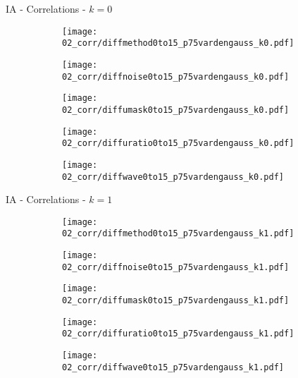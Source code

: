 \documentclass{beamer}
\begin{document}
\begin{frame}{IA - Correlations - $k=0$}{}
\begin{figure}
\centering
\begin{subfigure}{0.19\textwidth}
\texttt{[image: 02\_corr/diffmethod0to15\_p75vardengauss\_k0.pdf]}
\end{subfigure}
\begin{subfigure}{0.19\textwidth}
\texttt{[image: 02\_corr/diffnoise0to15\_p75vardengauss\_k0.pdf]}
\end{subfigure}
\begin{subfigure}{0.19\textwidth}
\texttt{[image: 02\_corr/diffumask0to15\_p75vardengauss\_k0.pdf]}
\end{subfigure}
\begin{subfigure}{0.19\textwidth}
\texttt{[image: 02\_corr/diffuratio0to15\_p75vardengauss\_k0.pdf]}
\end{subfigure}
\begin{subfigure}{0.19\textwidth}
\texttt{[image: 02\_corr/diffwave0to15\_p75vardengauss\_k0.pdf]}
\end{subfigure}
\end{figure}
\end{frame}

\begin{frame}{IA - Correlations - $k=1$}{}
\begin{figure}
\centering
\begin{subfigure}{0.19\textwidth}
\texttt{[image: 02\_corr/diffmethod0to15\_p75vardengauss\_k1.pdf]}
\end{subfigure}
\begin{subfigure}{0.19\textwidth}
\texttt{[image: 02\_corr/diffnoise0to15\_p75vardengauss\_k1.pdf]}
\end{subfigure}
\begin{subfigure}{0.19\textwidth}
\texttt{[image: 02\_corr/diffumask0to15\_p75vardengauss\_k1.pdf]}
\end{subfigure}
\begin{subfigure}{0.19\textwidth}
\texttt{[image: 02\_corr/diffuratio0to15\_p75vardengauss\_k1.pdf]}
\end{subfigure}
\begin{subfigure}{0.19\textwidth}
\texttt{[image: 02\_corr/diffwave0to15\_p75vardengauss\_k1.pdf]}
\end{subfigure}
\end{figure}
\end{frame}
\end{document}
